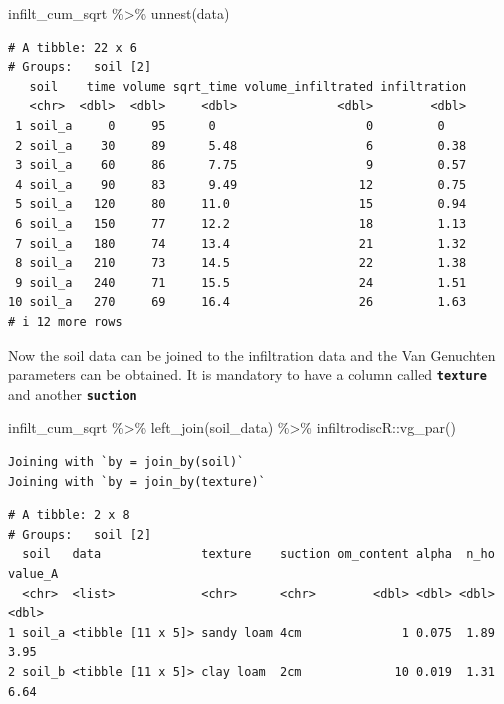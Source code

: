 \documentclass[
]{article}
\newenvironment{Shaded}{\begin{snugshade}}{\end{snugshade}}
\newcommand{\FunctionTok}[1]{\textcolor[rgb]{0.28,0.35,0.67}{#1}}
\newcommand{\NormalTok}[1]{\textcolor[rgb]{0.00,0.23,0.31}{#1}}
\newcommand{\SpecialCharTok}[1]{\textcolor[rgb]{0.37,0.37,0.37}{#1}}
\begin{document}
\begin{Shaded}
\begin{Highlighting}[]
\NormalTok{infilt\_cum\_sqrt }\SpecialCharTok{\%\textgreater{}\%} 
  \FunctionTok{unnest}\NormalTok{(data)}
\end{Highlighting}
\end{Shaded}

\begin{verbatim}
# A tibble: 22 x 6
# Groups:   soil [2]
   soil    time volume sqrt_time volume_infiltrated infiltration
   <chr>  <dbl>  <dbl>     <dbl>              <dbl>        <dbl>
 1 soil_a     0     95      0                     0         0   
 2 soil_a    30     89      5.48                  6         0.38
 3 soil_a    60     86      7.75                  9         0.57
 4 soil_a    90     83      9.49                 12         0.75
 5 soil_a   120     80     11.0                  15         0.94
 6 soil_a   150     77     12.2                  18         1.13
 7 soil_a   180     74     13.4                  21         1.32
 8 soil_a   210     73     14.5                  22         1.38
 9 soil_a   240     71     15.5                  24         1.51
10 soil_a   270     69     16.4                  26         1.63
# i 12 more rows
\end{verbatim}

Now the soil data can be joined to the infiltration data and the Van
Genuchten parameters can be obtained. It is mandatory to have a column
called \textbf{\texttt{texture}} and another \textbf{\texttt{suction}}

\begin{Shaded}
\begin{Highlighting}[]
\NormalTok{infilt\_cum\_sqrt }\SpecialCharTok{\%\textgreater{}\%} 
  \FunctionTok{left\_join}\NormalTok{(soil\_data) }\SpecialCharTok{\%\textgreater{}\%} 
\NormalTok{  infiltrodiscR}\SpecialCharTok{::}\FunctionTok{vg\_par}\NormalTok{()}
\end{Highlighting}
\end{Shaded}

\begin{verbatim}
Joining with `by = join_by(soil)`
Joining with `by = join_by(texture)`
\end{verbatim}

\begin{verbatim}
# A tibble: 2 x 8
# Groups:   soil [2]
  soil   data              texture    suction om_content alpha  n_ho value_A
  <chr>  <list>            <chr>      <chr>        <dbl> <dbl> <dbl>   <dbl>
1 soil_a <tibble [11 x 5]> sandy loam 4cm              1 0.075  1.89    3.95
2 soil_b <tibble [11 x 5]> clay loam  2cm             10 0.019  1.31    6.64
\end{verbatim}
\end{document}
